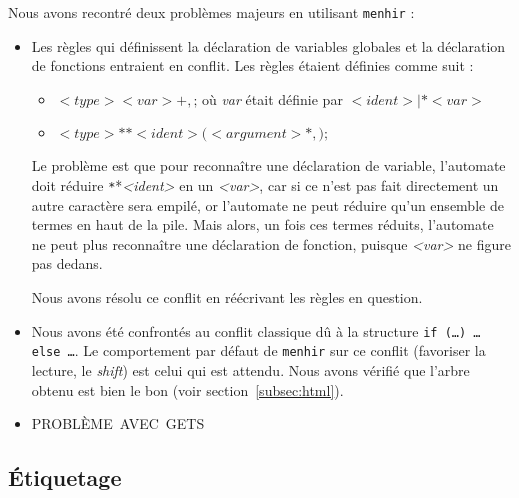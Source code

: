 \documentclass[a4paper]{article}
\begin{document}
Nous avons recontré deux problèmes majeurs en utilisant \texttt{menhir} :
\begin{itemize}
    \item Les règles qui définissent la déclaration de variables globales et la déclaration de fonctions entraient en conflit.
          Les règles étaient définies comme suit :
          \begin{itemize}
              \item $<type> <var>+,\texttt{;}$ où \emph{var} était définie par $<ident> | \texttt{*} <var>$
              \item $<type> \texttt{*}* <ident>\texttt{(} <argument>*, \texttt{);}$
          \end{itemize}
          Le problème est que pour reconnaître une déclaration de variable, l'automate doit réduire \texttt{*}*\emph{<ident>} en un \emph{<var>}, car si ce n'est pas fait directement un autre caractère sera empilé, or l'automate ne peut réduire qu'un ensemble de termes en haut de la pile. Mais alors, un fois ces termes réduits, l'automate ne peut plus reconnaître une déclaration de fonction, puisque \emph{<var>} ne figure pas dedans.

          Nous avons résolu ce conflit en réécrivant les règles en question.

      \item Nous avons été confrontés au conflit classique dû à la structure \texttt{if (…) … else …}.
            Le comportement par défaut de \texttt{menhir} sur ce conflit (favoriser la lecture, le \emph{shift}) est celui qui est attendu. Nous avons vérifié que l'arbre obtenu est bien le bon (voir section~\ref{subsec:html}).
      \item PROBLÈME AVEC GETS

\end{itemize}

\subsection{Étiquetage}
\end{document}
